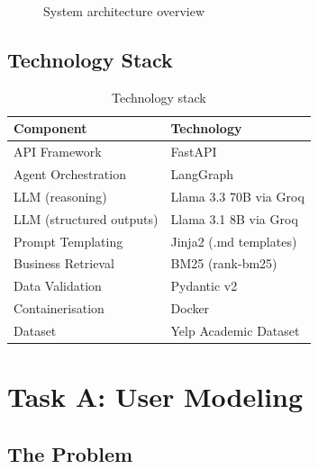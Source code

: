 \documentclass[11pt,a4paper]{article}
\begin{document}
\begin{figure}[h]
\centering
\caption{System architecture overview}
\label{fig:arch}
\end{figure}

\subsection{Technology Stack}

\begin{table}[h]
\centering
\begin{tabular}{ll}
\toprule
\textbf{Component} & \textbf{Technology} \\
\midrule
API Framework         & FastAPI \\
Agent Orchestration   & LangGraph \\
LLM (reasoning)       & Llama 3.3 70B via Groq \\
LLM (structured outputs) & Llama 3.1 8B via Groq \\
Prompt Templating     & Jinja2 (.md templates) \\
Business Retrieval    & BM25 (rank-bm25) \\
Data Validation       & Pydantic v2 \\
Containerisation      & Docker \\
Dataset               & Yelp Academic Dataset \\
\bottomrule
\end{tabular}
\caption{Technology stack}
\label{tab:stack}
\end{table}

\section{Task A: User Modeling}

\subsection{The Problem}
\end{document}
